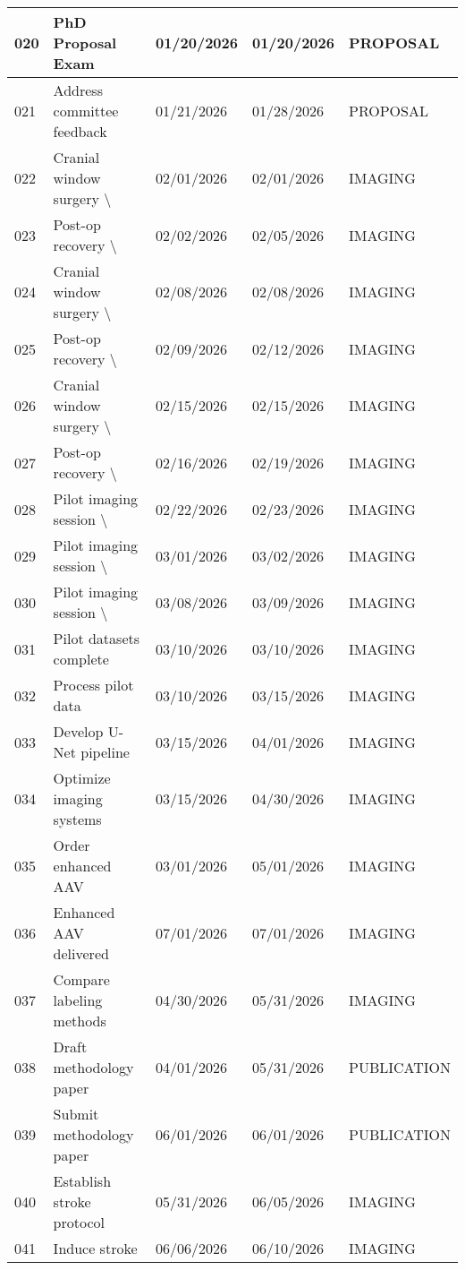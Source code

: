 \documentclass[portrait,a4paper]{article}
\begin{document}
\begin{longtable}{|p{}|p{}|p{}|p{}|p{}|}
\hline
020 & PhD Proposal Exam & 01/20/2026 & 01/20/2026 & PROPOSAL \\
\hline
021 & Address committee feedback & 01/21/2026 & 01/28/2026 & PROPOSAL \\
\hline
022 & Cranial window surgery \textbackslash{}#1 & 02/01/2026 & 02/01/2026 & IMAGING \\
\hline
023 & Post-op recovery \textbackslash{}#1 & 02/02/2026 & 02/05/2026 & IMAGING \\
\hline
024 & Cranial window surgery \textbackslash{}#2 & 02/08/2026 & 02/08/2026 & IMAGING \\
\hline
025 & Post-op recovery \textbackslash{}#2 & 02/09/2026 & 02/12/2026 & IMAGING \\
\hline
026 & Cranial window surgery \textbackslash{}#3 & 02/15/2026 & 02/15/2026 & IMAGING \\
\hline
027 & Post-op recovery \textbackslash{}#3 & 02/16/2026 & 02/19/2026 & IMAGING \\
\hline
028 & Pilot imaging session \textbackslash{}#1 & 02/22/2026 & 02/23/2026 & IMAGING \\
\hline
029 & Pilot imaging session \textbackslash{}#2 & 03/01/2026 & 03/02/2026 & IMAGING \\
\hline
030 & Pilot imaging session \textbackslash{}#3 & 03/08/2026 & 03/09/2026 & IMAGING \\
\hline
031 & Pilot datasets complete & 03/10/2026 & 03/10/2026 & IMAGING \\
\hline
032 & Process pilot data & 03/10/2026 & 03/15/2026 & IMAGING \\
\hline
033 & Develop U-Net pipeline & 03/15/2026 & 04/01/2026 & IMAGING \\
\hline
034 & Optimize imaging systems & 03/15/2026 & 04/30/2026 & IMAGING \\
\hline
035 & Order enhanced AAV & 03/01/2026 & 05/01/2026 & IMAGING \\
\hline
036 & Enhanced AAV delivered & 07/01/2026 & 07/01/2026 & IMAGING \\
\hline
037 & Compare labeling methods & 04/30/2026 & 05/31/2026 & IMAGING \\
\hline
038 & Draft methodology paper & 04/01/2026 & 05/31/2026 & PUBLICATION \\
\hline
039 & Submit methodology paper & 06/01/2026 & 06/01/2026 & PUBLICATION \\
\hline
040 & Establish stroke protocol & 05/31/2026 & 06/05/2026 & IMAGING \\
\hline
041 & Induce stroke & 06/06/2026 & 06/10/2026 & IMAGING \\

\end{longtable}
\end{document}
